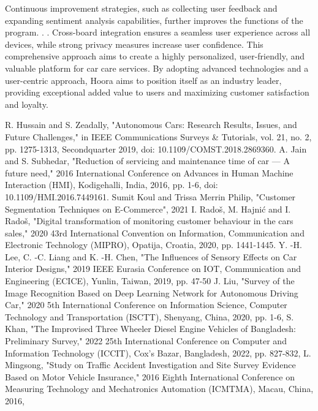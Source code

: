 \documentclass[conference]{IEEEtran}
\begin{document}
Continuous improvement strategies, such as collecting user feedback and expanding sentiment analysis capabilities, further improves the functions of the program. . . Cross-board integration ensures a seamless user experience across all devices, while strong privacy measures increase user confidence. This comprehensive approach aims to create a highly personalized, user-friendly, and valuable platform for car care services. By adopting advanced technologies and a user-centric approach, Hoora aims to position itself as an industry leader, providing exceptional added value to users and maximizing customer satisfaction and loyalty.



\begin{thebibliography}{00}
 R. Hussain and S. Zeadally, "Autonomous Cars: Research Results, Issues, and Future Challenges," in IEEE Communications Surveys \& Tutorials, vol. 21, no. 2, pp. 1275-1313, Secondquarter 2019, doi: 10.1109/COMST.2018.2869360.
 A. Jain and S. Subhedar, "Reduction of servicing and maintenance time of car — A future need," 2016 International Conference on Advances in Human Machine Interaction (HMI), Kodigehalli, India, 2016, pp. 1-6, doi: 10.1109/HMI.2016.7449161. 
 Sumit Koul and Trissa Merrin Philip, "Customer Segmentation Techniques on E-Commerce", 2021
 I. Radoš, M. Hajnić and I. Radoš, "Digital transformation of monitoring customer behaviour in the cars sales," 2020 43rd International Convention on Information, Communication and Electronic Technology (MIPRO), Opatija, Croatia, 2020, pp. 1441-1445. 
 Y. -H. Lee, C. -C. Liang and K. -H. Chen, "The Influences of Sensory Effects on Car Interior Designs," 2019 IEEE Eurasia Conference on IOT, Communication and Engineering (ECICE), Yunlin, Taiwan, 2019, pp. 47-50
 J. Liu, "Survey of the Image Recognition Based on Deep Learning Network for Autonomous Driving Car," 2020 5th International Conference on Information Science, Computer Technology and Transportation (ISCTT), Shenyang, China, 2020, pp. 1-6,
 S. Khan, "The Improvised Three Wheeler Diesel Engine Vehicles of Bangladesh: Preliminary Survey," 2022 25th International Conference on Computer and Information Technology (ICCIT), Cox's Bazar, Bangladesh, 2022, pp. 827-832,
 L. Mingsong, "Study on Traffic Accident Investigation and Site Survey Evidence Based on Motor Vehicle Insurance," 2016 Eighth International Conference on Measuring Technology and Mechatronics Automation (ICMTMA), Macau, China, 2016, 

\end{thebibliography}
\end{document}
